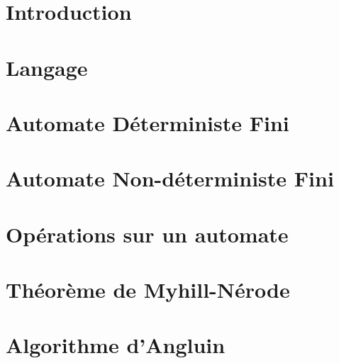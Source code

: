 

\newcommand{\student}{Benjamin André}
\newcommand{\grade}{MAB2 Sciences Informatiques}
\newcommand{\director}{Véronique Bruyère}
\renewcommand{\title}{Automates}
\renewcommand{\date}{\today}


	
		
	
	\tableofcontents
	\newpage
	
	\section{Introduction}\label{sec:intro}
	\section{Langage}\label{sec:langage}
	\section{Automate Déterministe Fini}\label{sec:adf}
	\section{Automate Non-déterministe Fini}\label{sec:anf}
	\section{Opérations sur un automate}\label{sec:opauto}
	\section{Théorème de Myhill-Nérode}\label{sec:m_n}
	\section{Algorithme d'Angluin}\label{sec:angluin}
	
	\newpage
	
	
	

